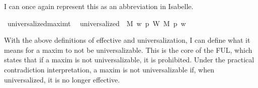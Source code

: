 \begin{isabellebody}
\begin{isamarkuptext}
\noindent I can once again represent this as an abbreviation in Isabelle.%
\end{isamarkuptext}\isamarkuptrue%
\isamarkupfalse%
\ universalized{\isacharcolon}{\isacharcolon}{\isachardoublequoteopen}maxim{\isasymRightarrow}t{\isachardoublequoteclose}\ \ \isanewline
{\isachardoublequoteopen}universalized\ {\isasymequiv}\ {\isasymlambda}M{\isachardot}\ {\isacharparenleft}{\isasymlambda}w{\isachardot}\ {\isacharparenleft}{\isasymforall}p{\isachardot}\ {\isacharparenleft}W\ M\ p{\isacharparenright}\ w{\isacharparenright}{\isacharparenright}{\isachardoublequoteclose}\isanewline
%
%
\begin{isamarkuptext}%
With the above definitions of effective and universalization, I can define what it means for 
a maxim to not be universalizable. This is the core of the FUL, which states that if a maxim is not 
universalizable, it is prohibited. Under the practical contradiction interpretation, a maxim is 
not universalizable if, when universalized, it is no longer effective.


\end{isamarkuptext}
\end{isabellebody}
